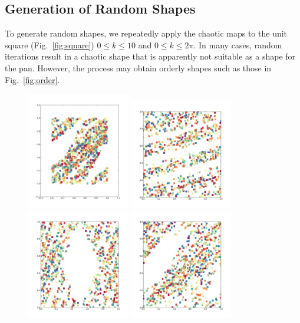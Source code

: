 \documentclass[12pt]{reedmcm}
\begin{document}
\subsection{Generation of Random Shapes}
To generate random shapes, we repeatedly apply the chaotic maps to the unit square (Fig.~\ref{fig:square}) $0 \leq k \leq 10$ and $0 \leq k \leq 2\pi$.
In many cases, random iterations result in a chaotic shape that is apparently not suitable as a shape for the pan. 
However, the process may obtain orderly shapes such as those in Fig.~\ref{fig:order}.
\begin{figure}[h!]
  \centering
  \includegraphics[width=0.4\textwidth]{random2}
  \includegraphics[width=0.4\textwidth]{random128}
  \includegraphics[width=0.4\textwidth]{random256}
  \includegraphics[width=0.4\textwidth]{random1280}

\end{figure}
\end{document}

